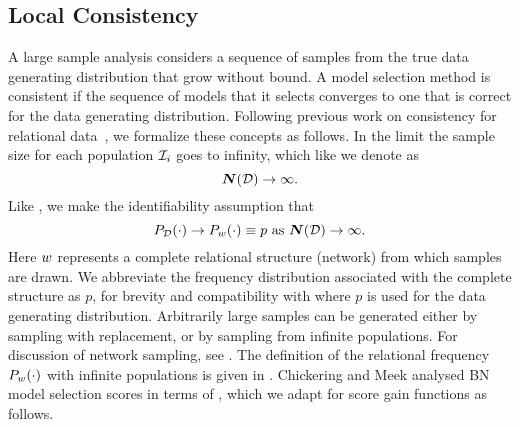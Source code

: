 \documentclass[letterpaper]{article}
\begin{document}
\subsection{Local Consistency} A large sample analysis considers a sequence of samples from the true data generating distribution that grow without bound. A model selection method is consistent if the sequence of models that it selects converges to one that is correct for the data generating distribution. Following previous work on consistency for relational data~\cite{Sakai2013,Xiang2011,Shalizi2013}, we formalize these concepts as follows. In the limit the sample size for each population $\mathcal{I}_{i}$ goes to infinity, 
which like \cite{Sakai2013} we 
denote as $$\boldsymbol{N}(\mathcal{D}) \rightarrow \infty.$$  Like \cite{Xiang2011}, we make the identifiability assumption that  $$P_{\mathcal{D}}(\cdot)\rightarrow P_{w}(\cdot) \equiv p  \mbox{ as } \boldsymbol{N}(\mathcal{D}) \rightarrow \infty.$$ Here $w$ represents a complete relational structure (network) from which samples are drawn. We abbreviate the frequency distribution associated with the complete structure as $p$, for brevity and compatibility with \cite{Chickering2003} where $p$ is used for the data generating distribution.
%
 Arbitrarily large samples can be generated either by sampling with replacement, or by sampling from infinite populations.  For  discussion of network sampling, see \cite{Shalizi2013,Frank1977}. The definition of the relational frequency $P_{w}(\cdot)$ with infinite populations is given in \cite{Halpern90}.
%
%
%
Chickering and Meek analysed BN model selection scores in terms of , which we adapt for score gain functions as follows.
\end{document}
